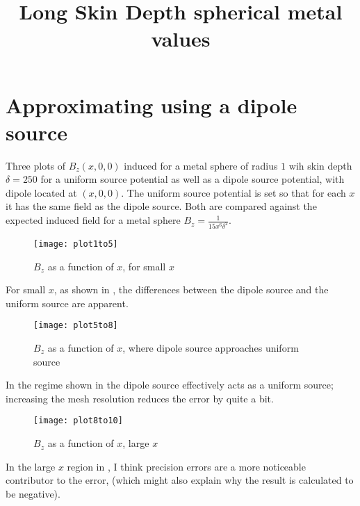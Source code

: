\documentclass[11pt]{article}
\title{Long Skin Depth spherical metal values}
\date{}
\author{}
\begin{document}
\graphicspath{{figures/}}

\maketitle

\section{Approximating using a dipole source}\label{sec:spheredipolesource}

Three plots of $B_z(x, 0, 0)$ induced for a metal sphere of radius $1$ wih skin depth $\delta = 250$ for a uniform source potential as well
as a dipole source potential, with dipole located at $(x, 0, 0)$.
The uniform source potential is set so that for each $x$ it has the same field as the dipole source.
Both are compared against the expected induced field for a metal sphere $B_z = \frac{1}{15 x^6 \delta^2}$.

\begin{figure}[htp]
	\centering
	\texttt{[image: plot1to5]}
	\caption{$B_z$ as a function of $x$, for small $x$ \label{fig:plotx1to5}}
\end{figure}

For small $x$, as shown in , the differences between the dipole source and the uniform source are
apparent.

\begin{figure}[htp]
	\centering
	\texttt{[image: plot5to8]}
	\caption{$B_z$ as a function of $x$, where dipole source approaches uniform source \label{fig:plotx5to8}}
\end{figure}

In the regime shown in  the dipole source effectively acts as a uniform source;
increasing the mesh resolution reduces the error by quite a bit.

\begin{figure}[htp]
	\centering
	\texttt{[image: plot8to10]}
	\caption{$B_z$ as a function of $x$, large $x$ \label{fig:plotx8to10}}
\end{figure}

In the large $x$ region in , I think precision errors are a more noticeable contributor to the
error, (which might also explain why the result is calculated to be negative).
\end{document}

